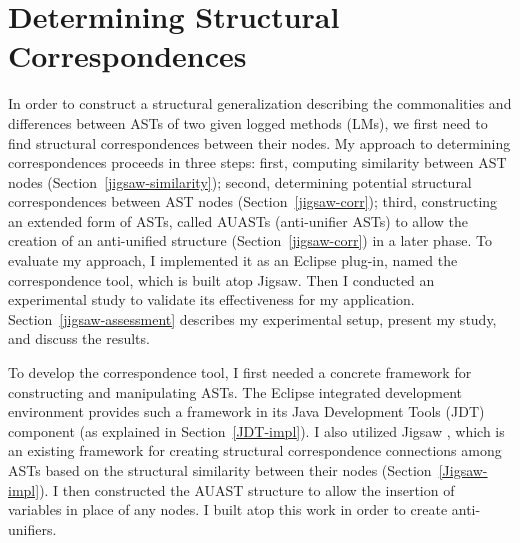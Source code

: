 \chapter{Determining Structural Correspondences}\label{background2}
In order to construct a structural generalization describing the commonalities and differences between ASTs of two given logged methods (LMs), we first need to find structural correspondences between their nodes. My approach to determining correspondences proceeds in three steps: first, computing similarity between AST nodes (Section~\ref{jigsaw-similarity}); second, determining potential structural correspondences between AST nodes (Section~\ref{jigsaw-corr}); third, constructing an extended form of ASTs, called AUASTs (anti-unifier ASTs) to allow the creation of an anti-unified structure (Section~\ref{jigsaw-corr}) in a later phase. To evaluate my approach, I implemented it as an Eclipse plug-in, named the correspondence tool, which is built atop Jigsaw. Then I conducted an experimental study to validate its effectiveness for my application. Section~\ref{jigsaw-assessment} describes my experimental setup, present my study, and discuss the results. 

To develop the correspondence tool, I first needed a concrete framework for constructing and manipulating ASTs. The Eclipse integrated development environment provides such a framework in its Java Development Tools (JDT) component (as explained in Section~\ref{JDT-impl}). I also utilized Jigsaw \cite{2008:fse:cottrell}, which is an existing framework for creating structural correspondence connections among ASTs based on the structural similarity between their nodes (Section~\ref{Jigsaw-impl}). I then constructed the AUAST structure to allow the insertion of variables in place of any nodes. I built atop this work in order to create anti-unifiers. 





